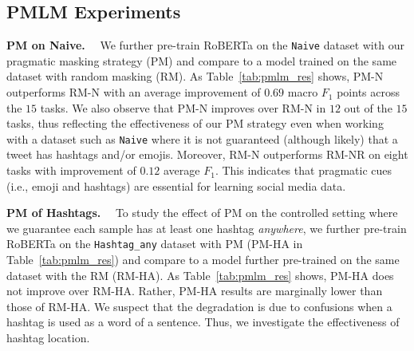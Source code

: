 \subsection{PMLM Experiments}\label{subsec:pmlm_res}
 

\textbf{PM on Naive.}~~ We further pre-train RoBERTa on the \texttt{Naive} dataset with our pragmatic masking strategy (PM) and compare to a model trained on the same dataset with random masking (RM). As Table~\ref{tab:pmlm_res} shows, PM-N outperforms RM-N with an average improvement of $0.69$ macro $F_1$ points across the $15$ tasks. %
 We also observe that PM-N improves over RM-N in $12$ out of the $15$ tasks, thus reflecting the effectiveness of our PM strategy even when working with a dataset such as \texttt{Naive} where it is not guaranteed (although likely) that a tweet has hashtags and/or emojis. Moreover, RM-N outperforms RM-NR on eight tasks with improvement of $0.12$ average $F_1$. This indicates that pragmatic cues (i.e., emoji and hashtags) are essential for learning social media data. 



\noindent\textbf{PM of Hashtags.}~~ To study the effect of PM on the controlled setting where we guarantee each sample has at least one hashtag \textit{anywhere}, we further pre-train RoBERTa on the \texttt{Hashtag\_any} dataset with PM (PM-HA in Table~\ref{tab:pmlm_res}) and compare to a model further pre-trained on the same dataset with the RM (RM-HA). As Table~\ref{tab:pmlm_res} shows, PM-HA does not improve over RM-HA. Rather, PM-HA results are marginally lower than those of RM-HA. We suspect that the degradation is due to confusions when a hashtag is used as a word of a sentence. Thus, we investigate the effectiveness of hashtag location.



